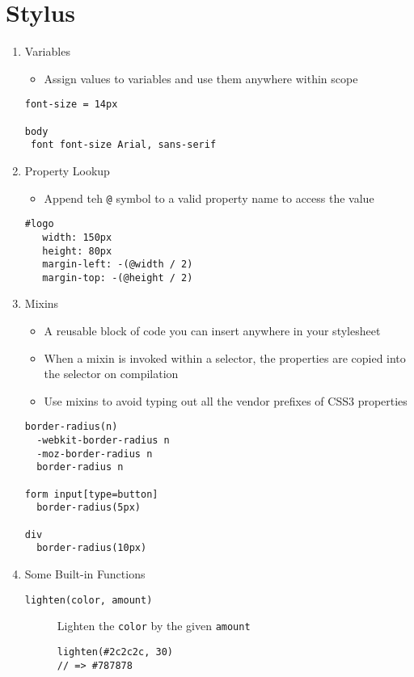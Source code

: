 \documentclass[10pt, twocolumn]{article}
\begin{document}
\section{Stylus}
\begin{enumerate}

\item Variables
\begin{itemize}
\item Assign values to variables and use them anywhere within scope
\end{itemize}
\begin{lstlisting}[frame=single]
font-size = 14px

body
 font font-size Arial, sans-serif
\end{lstlisting}

\item Property Lookup
\begin{itemize}
\item Append teh \texttt{@} symbol to a valid property name to access the value
\end{itemize}
\begin{lstlisting}[frame=single]
#logo
   width: 150px
   height: 80px
   margin-left: -(@width / 2)
   margin-top: -(@height / 2)
\end{lstlisting}

\item Mixins
\begin{itemize}
\item A reusable block of code you can insert anywhere in your stylesheet
\item When a mixin is invoked within a selector, the properties are copied into the selector on compilation
\item Use mixins to avoid typing out all the vendor prefixes of CSS3 properties
\end{itemize}
\begin{lstlisting}[frame=single]
border-radius(n)
  -webkit-border-radius n
  -moz-border-radius n
  border-radius n

form input[type=button]
  border-radius(5px)

div
  border-radius(10px)    
\end{lstlisting}

\item Some Built-in Functions
\begin{description}
\item[\texttt{lighten(color, amount)}] Lighten the \texttt{color} by the given \texttt{amount}
\begin{lstlisting}[frame=single]
lighten(#2c2c2c, 30)
// => #787878


\end{lstlisting}
\end{description}
\end{enumerate}
\end{document}
